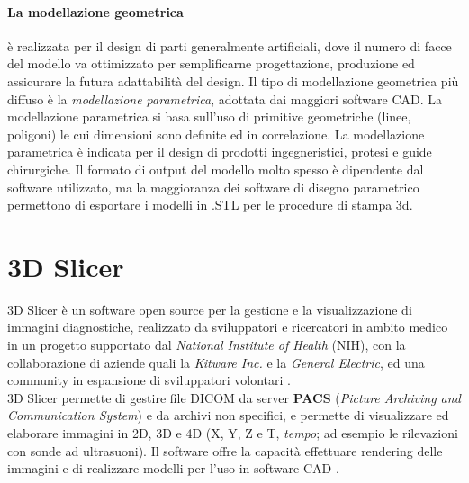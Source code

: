 \paragraph{La modellazione geometrica} è realizzata per il design di parti generalmente artificiali, dove il numero di facce del modello va ottimizzato per semplificarne progettazione, produzione ed assicurare la futura adattabilità del design. Il tipo di modellazione geometrica più diffuso è la \emph{modellazione parametrica}, adottata dai maggiori software CAD. La modellazione parametrica si basa sull'uso di primitive geometriche (linee, poligoni) le cui dimensioni sono definite ed in correlazione. La modellazione parametrica è indicata per il design di prodotti ingegneristici, protesi e guide chirurgiche. Il formato di output del modello molto spesso è dipendente dal software utilizzato, ma la maggioranza dei software di disegno parametrico permettono di esportare i modelli in .STL per le procedure di stampa 3d.

\section{3D Slicer}	
3D Slicer è un software open source per la gestione e la visualizzazione di immagini diagnostiche, realizzato da sviluppatori e ricercatori in ambito medico in un progetto supportato dal \emph{National Institute of Health} (NIH), con la collaborazione di aziende quali la \emph{Kitware Inc.} e la \emph{General Electric}, ed una community in espansione di sviluppatori volontari \parencite{Reference28}.\\
3D Slicer permette di gestire file DICOM da server \textbf{PACS} (\emph{Picture Archiving and Communication System}) e da archivi non specifici, e permette di visualizzare ed elaborare immagini in 2D, 3D e 4D (X, Y, Z e T, \emph{tempo}; ad esempio le rilevazioni con sonde ad ultrasuoni). Il software offre la capacità effettuare rendering delle immagini e di realizzare modelli per l'uso in software CAD \parencite{Reference31}.


